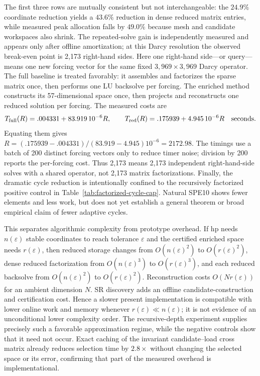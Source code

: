 \documentclass[11pt]{article}
\numberwithin{algorithm}{section}
\theoremstyle{definition}\newtheorem{definition}[theorem]{Definition}
\theoremstyle{remark}\newtheorem{remark}[theorem]{Remark}
\begin{document}
The first three rows are mutually consistent but not interchangeable: the
$24.9\%$ coordinate reduction yields a $43.6\%$ reduction in dense reduced
matrix entries, while measured peak allocation falls by $49.0\%$ because mesh
and candidate workspaces also shrink.  The repeated-solve gain is independently
measured and appears only after offline amortization; at this Darcy resolution
the observed break-even point is 2,173 right-hand sides.  Here one right-hand
side---or query---means one new forcing vector for the same fixed
$3,969\times3,969$ Darcy operator.  The full baseline is treated favorably: it
assembles and factorizes the sparse matrix once, then performs one LU backsolve
per forcing.  The enriched method constructs its 57-dimensional space once,
then projects and reconstructs one reduced solution per forcing.  The measured
costs are
\[
 T_{\rm full}(R)=.004331+83.919\,10^{-6}R,
 \qquad
 T_{\rm red}(R)=.175939+4.945\,10^{-6}R
 \quad\hbox{seconds}.
\]
Equating them gives
$R=(.175939-.004331)/(83.919-4.945)10^{-6}=2172.98$.
The timings use a batch of 200 distinct forcing vectors only to reduce timer
noise; division by 200 reports the per-forcing cost.  Thus 2,173 means 2,173
independent right-hand-side solves with a shared operator, not 2,173 matrix
factorizations.  Finally, the dramatic
cycle reduction is intentionally confined to the recursively factorized
positive control in Table~\ref{tab:factorized-cycle-cap}.  Natural SPE10 shows
fewer elements and less work, but does not yet establish a general theorem or
broad empirical claim of fewer adaptive cycles.

This separates algorithmic complexity from prototype overhead.  If hp needs
$n(\varepsilon)$ stable coordinates to reach tolerance $\varepsilon$ and the
certified enriched space needs $r(\varepsilon)$, then reduced storage changes
from $O(n(\varepsilon)^2)$ to $O(r(\varepsilon)^2)$, dense reduced
factorization from $O(n(\varepsilon)^3)$ to $O(r(\varepsilon)^3)$, and each
reduced backsolve from $O(n(\varepsilon)^2)$ to
$O(r(\varepsilon)^2)$.  Reconstruction costs $O(Nr(\varepsilon))$ for an
ambient dimension $N$.  SR discovery adds an offline candidate-construction
and certification cost.  Hence a slower present implementation is compatible
with lower online work and memory whenever $r(\varepsilon)\ll
n(\varepsilon)$; it is not evidence of an unconditional lower complexity
order.  The recursive-depth experiment supplies precisely such a favorable
approximation regime, while the negative controls show that it need not occur.
Exact caching of the invariant candidate--load cross matrix already reduces
selection time by $2.8\times$ without changing the selected space or its
error, confirming that part of the measured overhead is implementational.
\end{document}

